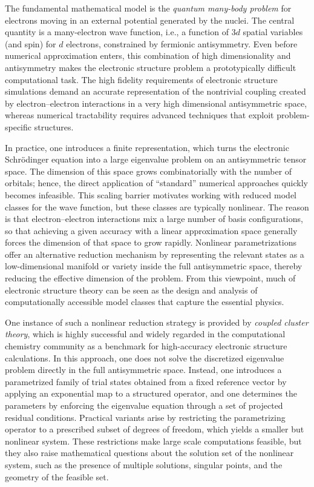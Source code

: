 \documentclass[11pt,reqno]{amsart}
\theoremstyle{definition}
\numberwithin{theorem}{section}
\numberwithin{equation}{section}
\begin{document}
The fundamental mathematical model is the {\it quantum many-body problem} for electrons moving in an external potential generated by the nuclei. The central quantity is a many-electron wave function, i.e., a function of $3d$ spatial variables (and spin) for $d$ electrons, constrained by fermionic antisymmetry. Even before numerical approximation enters, this combination of high dimensionality and antisymmetry makes the electronic structure problem a prototypically difficult computational task. The high fidelity requirements of electronic structure simulations demand an accurate representation of the nontrivial coupling created by electron--electron interactions in a very high dimensional antisymmetric space, whereas numerical tractability requires advanced techniques that exploit problem-specific structures.

In practice, one introduces a finite representation, which turns the electronic Schr\"odinger equation into a large eigenvalue problem on an antisymmetric tensor space. The dimension of this space grows combinatorially with the number of orbitals; hence, the direct application of ``standard'' numerical approaches quickly becomes infeasible. This scaling barrier motivates working with reduced model classes for the wave function, but these classes are typically nonlinear. The reason is that electron--electron interactions mix a large number of basis configurations, so that achieving a given accuracy with a linear approximation space generally forces the dimension of that space to grow rapidly. Nonlinear parametrizations offer an alternative reduction mechanism by representing the relevant states as a low-dimensional manifold or variety inside the full antisymmetric space, thereby reducing the effective dimension of the problem. From this viewpoint, much of electronic structure theory can be seen as the design and analysis of computationally accessible model classes that capture the essential physics.

One instance of such a nonlinear reduction strategy is provided by {\it coupled cluster theory}, which is highly successful and widely regarded in the computational chemistry community as a benchmark for high-accuracy electronic structure calculations. In this approach, one does not solve the discretized eigenvalue problem directly in the full antisymmetric space. Instead, one introduces a parametrized family of trial states obtained from a fixed reference vector by applying an exponential map to a structured operator, and one determines the parameters by enforcing the eigenvalue equation through a set of projected residual conditions. Practical variants arise by restricting the parametrizing operator to a prescribed subset of degrees of freedom, which yields a smaller but nonlinear system. These restrictions make large scale computations feasible, but they also raise mathematical questions about the solution set of the nonlinear system, such as the presence of multiple solutions, singular points, and the geometry of the feasible set.
\end{document}
